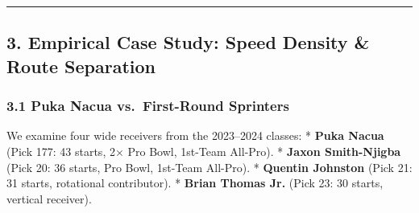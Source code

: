 \documentclass[
  letterpaper,
  DIV=11,
  numbers=noendperiod]{scrartcl}
\begin{document}
\begin{center}\rule{0.5\linewidth}{0.5pt}\end{center}

\subsection{3. Empirical Case Study: Speed Density \& Route
Separation}\label{empirical-case-study-speed-density-route-separation}

\subsubsection{3.1 Puka Nacua vs.~First-Round
Sprinters}\label{puka-nacua-vs.-first-round-sprinters}

We examine four wide receivers from the 2023--2024 classes: *
\textbf{Puka Nacua} (Pick 177: 43 starts, 2× Pro Bowl, 1st-Team
All-Pro). * \textbf{Jaxon Smith-Njigba} (Pick 20: 36 starts, Pro Bowl,
1st-Team All-Pro). * \textbf{Quentin Johnston} (Pick 21: 31 starts,
rotational contributor). * \textbf{Brian Thomas Jr.} (Pick 23: 30
starts, vertical receiver).
\end{document}
